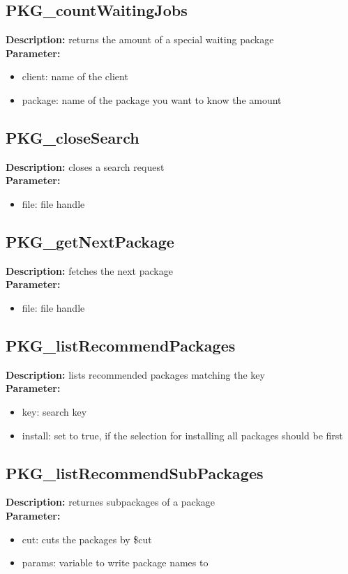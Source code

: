 \subsection{PKG\_countWaitingJobs}
\textbf{Description:} returns the amount of a special waiting package\\
\textbf{Parameter:}
\begin{itemize}
\item client: name of the client
\item package: name of the package you want to know the amount
\end{itemize}

\subsection{PKG\_closeSearch}
\textbf{Description:} closes a search request\\
\textbf{Parameter:}
\begin{itemize}
\item file: file handle
\end{itemize}

\subsection{PKG\_getNextPackage}
\textbf{Description:} fetches the next package\\
\textbf{Parameter:}
\begin{itemize}
\item file: file handle
\end{itemize}

\subsection{PKG\_listRecommendPackages}
\textbf{Description:} lists recommended packages matching the key\\
\textbf{Parameter:}
\begin{itemize}
\item key: search key
\item install: set to true, if the selection for installing all packages should be first
\end{itemize}

\subsection{PKG\_listRecommendSubPackages}
\textbf{Description:} returnes subpackages of a package\\
\textbf{Parameter:}
\begin{itemize}
\item cut: cuts the packages by \$cut
\item params: variable to write package names to
\end{itemize}

